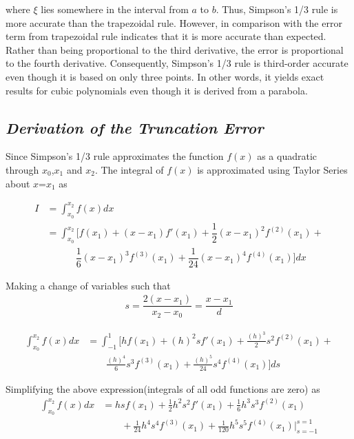 \documentclass[book.tex]{subfiles}
\begin{document}
where $\xi$ lies somewhere in the interval from $a$ to $b$. Thus, Simpson's 1/3 rule is more accurate than the trapezoidal rule. However, in comparison with the error term from trapezoidal rule indicates that it is more accurate than expected. Rather than being proportional to the third derivative, the error is proportional to the fourth derivative. Consequently, Simpson's 1/3 rule is third-order accurate even though it is based on only three points. In other words, it yields exact results for cubic polynomials even though it is derived from a parabola.

\subsection{\textit{Derivation of the Truncation Error}}

Since Simpson's 1/3 rule approximates the function $f(x)$ as a quadratic through $x_0$,$x_1$ and $x_2$. The integral of $f(x)$ is approximated using Taylor Series about $x$=$x_1$ as

\begin{align}
I &= \int_{x_0}^{x_2}f(x)dx \\
&= \int_{x_0}^{x_2}[f(x_{1}) + (x-x_1)f'(x_1) + \dfrac{1}{2}(x-x_1)^2f^{(2)}(x_1) + \\
& \nonumber \qquad \quad \dfrac{1}{6}(x-x_1)^3f^{(3)}(x_1) + \dfrac{1}{24}(x-x_1)^4f^{(4)}(x_1)]dx
\end{align}

Making a change of variables such that
\begin{align}
s = \dfrac{2(x-x_1)}{x_2-x_0} = \dfrac{x-x_1}{d}
\end{align}

\begin{align}
\int_{x_0}^{x_2}f(x)dx & =  \int_{-1}^{1}[hf(x_{1}) + (h)^2sf'(x_1) + \frac{(h)^3}{2}s^2f^{(2)}(x_1) + \\
& \nonumber \qquad \frac{(h)^4}{6}s^3f^{(3)}(x_1) + \frac{(h)^5}{24}s^4f^{(4)}(x_1)]ds 
\end{align}

Simplifying the above expression(integrals of all odd functions are zero) as
\begin{align}
\int_{x_0}^{x_2}f(x)dx &= hsf(x_{1}) + \frac{1}{2}h^2s^2f'(x_1) +  \frac{1}{6}h^3s^3f^{(2)}(x_1) \\
&\nonumber \qquad + \frac{1}{24}h^4s^4f^{(3)}(x_1) + \frac{1}{120}h^5s^5f^{(4)}(x_1)\rvert_{s=-1}^{s=1}
\end{align}
\end{document}
